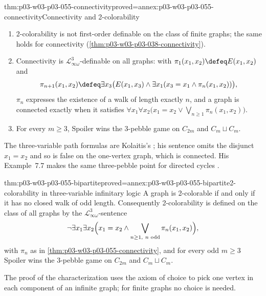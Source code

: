 \begin{hbcorollary}{thm:p03-w03-p03-055-connectivity}{proved=annex:p03-w03-p03-055-connectivity}{Connectivity and 2-colorability}
\leavevmode
\begin{enumerate}
\item 2-colorability is not first-order definable on the class of
      finite graphs; the same holds for connectivity
      (\cref{thm:p03-w03-p03-038-connectivity}).
\item Connectivity is \(\mathcal L^3_{\infty\omega}\)-definable on all
      graphs: with \(\pi_1(x_1,x_2)\defeq E(x_1,x_2)\) and
      \[
       \pi_{n+1}(x_1,x_2)\defeq\exists x_3\bigl(E(x_1,x_3)\wedge
       \exists x_1(x_3=x_1\wedge\pi_n(x_1,x_2))\bigr),
      \]
      \(\pi_n\) expresses the existence of a walk of length exactly \(n\),
      and a graph is connected exactly when it satisfies
      \(\forall x_1\forall x_2\bigl(x_1=x_2\vee\bigvee_{n\ge1}
      \pi_n(x_1,x_2)\bigr)\).
\item For every \(m\ge3\), Spoiler wins the \(3\)-pebble game on
      \(C_{2m}\) and \(C_m\sqcup C_m\).
\end{enumerate}
\end{hbcorollary}

The three-variable path formulas are Kolaitis's
\cite[pp.~53--54]{Kolaitis2003ExpressivePowerNotes}; his sentence omits the
disjunct \(x_1=x_2\) and so is false on the one-vertex graph, which is
connected. His Example~7.7 makes the same three-pebble point for directed
cycles \cite[pp.~56--57]{Kolaitis2003ExpressivePowerNotes}.

\begin{hblemma}{thm:p03-w03-p03-055-bipartite}{proved=annex:p03-w03-p03-055-bipartite}{2-colorability in three-variable infinitary logic}
A graph is 2-colorable if and only if it has no closed walk of odd length.
Consequently 2-colorability is defined on the class of all graphs by the
\(\mathcal L^3_{\infty\omega}\)-sentence
\[
 \neg\exists x_1\exists x_2\Bigl(x_1=x_2\wedge
 \bigvee_{n\ge1,\ n\text{ odd}}\pi_n(x_1,x_2)\Bigr),
\]
with \(\pi_n\) as in \cref{thm:p03-w03-p03-055-connectivity}, and for every
odd \(m\ge3\) Spoiler wins the \(3\)-pebble game on \(C_{2m}\) and
\(C_m\sqcup C_m\).
\end{hblemma}

The proof of the characterization uses the axiom of choice to pick one
vertex in each component of an infinite graph; for finite graphs no choice
is needed.

